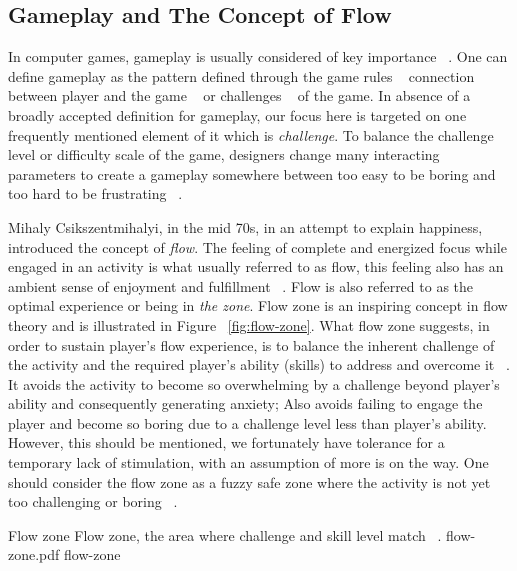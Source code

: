 \documentclass[conference]{IEEEtran}
\begin{document}
\subsection{Gameplay and The Concept of Flow}

In computer games, gameplay is usually considered of key importance ~\cite{rollings2006fundamentals, malone1982makes}. One can define gameplay as the pattern defined through the game rules ~\cite{salen2004rules, pajares2008understanding} connection between player and the game ~\cite{laramee2002game} or challenges ~\cite{rollings2003andrew} of the game. In absence of a broadly accepted definition for gameplay, our focus here is targeted on one frequently mentioned element of it which is \textit{challenge}. To balance the challenge level or difficulty scale of the game, designers change many interacting parameters to create a gameplay somewhere between too easy to be boring and too hard to be frustrating ~\cite{koster2013theory}.

Mihaly Csikszentmihalyi, in the mid 70s, in an attempt to explain happiness, introduced the concept of \textit{flow}. The feeling of complete and energized focus while engaged in an activity is what usually referred to as flow, this feeling also has an ambient sense of enjoyment and fulfillment ~\cite{csikszentmihalyi1990flow}. Flow is also referred to as the optimal experience or being in \textit{the zone}. Flow zone is an inspiring concept in flow theory and is illustrated in Figure ~\ref{fig:flow-zone}. What flow zone suggests, in order to sustain player's flow experience, is to balance the inherent challenge of the activity and the required player's ability (skills) to address and overcome it ~\cite{chen2007flow}. It avoids the activity to become so overwhelming by a challenge beyond player's ability and consequently generating anxiety; Also avoids failing to engage the player and become so boring due to a challenge level less than player's ability. However, this should be mentioned, we fortunately have tolerance for a temporary lack of stimulation, with an assumption of more is on the way. One should consider the flow zone as a fuzzy safe zone where the activity is not yet too challenging or boring ~\cite{csikszentmihalyi1990flow}.

\img
{Flow zone}
{Flow zone, the area where challenge and skill level match ~\cite{chen2007flow}.}
{flow-zone.pdf}
{flow-zone}
\end{document}
